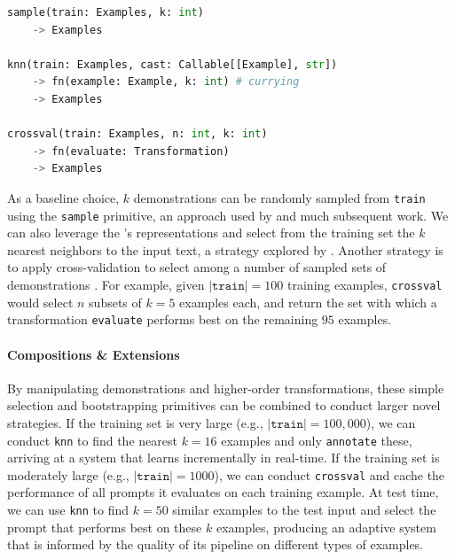 \begin{samepage}


\begin{lstlisting}[language=Python,breaklines=true,showstringspaces=false]
sample(train: Examples, k: int)
    -> Examples

knn(train: Examples, cast: Callable[[Example], str])
    -> fn(example: Example, k: int) # currying
    -> Examples

crossval(train: Examples, n: int, k: int)
    -> fn(evaluate: Transformation)
    -> Examples
\end{lstlisting}
\end{samepage}

As a baseline choice, $k$ demonstrations can be randomly sampled from \texttt{train} using the \texttt{sample} primitive, an approach used by \citet{brown2020language} and much subsequent work. We can also leverage the \RM{}'s representations and select from the training set the $k$ nearest neighbors to the input text, a strategy explored by \citet{liu2021makes}. Another strategy is to apply cross-validation to select among a number of sampled sets of demonstrations \cite{perez2021true}. For example, given $|\texttt{train}| = 100$ training examples, \texttt{crossval} would select $n$ subsets of $k = 5$ examples each, and return the set with which a transformation \texttt{evaluate} performs best on the remaining $95$ examples.

\vspace{-2mm}
\paragraph{Compositions \& Extensions}

By manipulating demonstrations and higher-order transformations, these simple selection and bootstrapping primitives can be combined to conduct larger novel strategies. If the training set is very large (e.g., $|\texttt{train}| = 100,000$), we can conduct \texttt{knn} to find the nearest $k=16$ examples and only \texttt{annotate} these, arriving at a system that learns incrementally in real-time. If the training set is moderately large (e.g., $|\texttt{train}| = 1000$), we can conduct \texttt{crossval} and cache the performance of all prompts it evaluates on each training example. At test time, we can use \texttt{knn} to find $k=50$ similar examples to the test input and select the prompt that performs best on these $k$ examples, producing an adaptive system that is informed by the quality of its pipeline on different types of examples.


